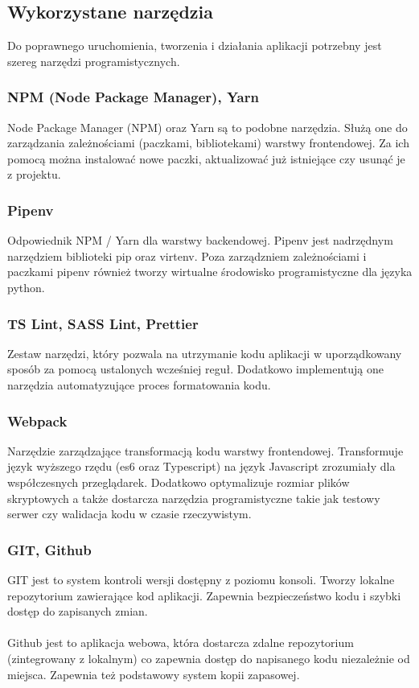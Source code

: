 \documentclass[eng,printmode]{mgr}
\begin{document}
\subsection{Wykorzystane narzędzia}
Do poprawnego uruchomienia, tworzenia i działania aplikacji potrzebny jest szereg narzędzi programistycznych.
\subsubsection{NPM (Node Package Manager), Yarn}
Node Package Manager (NPM) oraz Yarn są to podobne narzędzia. Służą one do zarządzania zależnościami (paczkami, bibliotekami) warstwy frontendowej. Za ich pomocą można instalować nowe paczki, aktualizować już istniejące czy usunąć je z projektu.
\subsubsection{Pipenv}
Odpowiednik NPM / Yarn dla warstwy backendowej. Pipenv jest nadrzędnym narzędziem biblioteki pip oraz virtenv. Poza zarządzniem zależnościami i paczkami pipenv również tworzy wirtualne środowisko programistyczne dla języka python.
\subsubsection{TS Lint, SASS Lint, Prettier}
Zestaw narzędzi, który pozwala na utrzymanie kodu aplikacji w uporządkowany sposób za pomocą ustalonych wcześniej reguł. Dodatkowo implementują one narzędzia automatyzujące proces formatowania kodu.
\subsubsection{Webpack}
Narzędzie zarządzające transformacją kodu warstwy frontendowej. Transformuje język wyższego rzędu (es6 oraz Typescript) na język Javascript zrozumiały dla współczesnych przeglądarek. Dodatkowo optymalizuje rozmiar plików skryptowych a także dostarcza narzędzia programistyczne takie jak testowy serwer czy walidacja kodu w czasie rzeczywistym.
\subsubsection{GIT, Github}
GIT jest to system kontroli wersji dostępny z poziomu konsoli. Tworzy lokalne repozytorium zawierające kod aplikacji. Zapewnia bezpieczeństwo kodu i szybki dostęp do zapisanych zmian.
\\\\
Github jest to aplikacja webowa, która dostarcza zdalne repozytorium (zintegrowany z lokalnym) co zapewnia dostęp do napisanego kodu niezależnie od miejsca. Zapewnia też podstawowy system kopii zapasowej.
\end{document}
